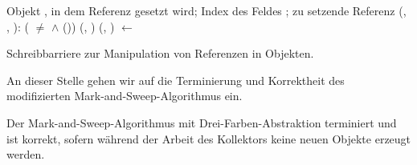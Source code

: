 \begin{algorithm}[h]
\begin{algorithmic}[1]
	\Input Objekt , in dem Referenz gesetzt wird; Index des Feldes ; zu setzende Referenz 
	\State \Atomic {}(, , ):
	\State \quad \IF ( $\neq$ \Null $\wedge$ ())
	\State \quad \quad {}(, )
	\State \quad \quad {}(, )
	\State \quad {} $\gets$ 
\end{algorithmic}
\caption[Schreibbarriere zur Manipulation von Referenzen]{Schreibbarriere zur Manipulation von Referenzen in Objekten.}
\label{algo:tricolor-barrier}
\end{algorithm}

An dieser Stelle gehen wir auf die Terminierung und Korrektheit des modifizierten Mark-and-Sweep-Algorithmus ein.

\begin{mybox}
\begin{satz}
	Der Mark-and-Sweep-Algorithmus mit Drei-Farben-Abstraktion terminiert und ist korrekt, sofern während der Arbeit des Kollektors keine neuen Objekte erzeugt werden.
\end{satz}
\end{mybox}

